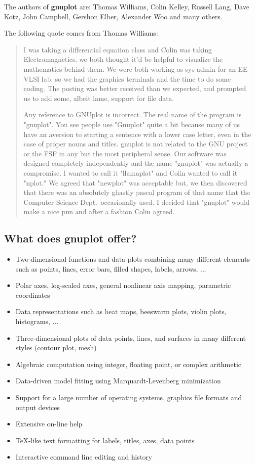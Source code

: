 \documentclass[a4paper,11pt]{article}
\newcommand{\gnuplot}{\textbf{gnuplot }}
\begin{document}
The authors of \gnuplot are:
Thomas Williams, Colin Kelley, Russell Lang, Dave Kotz, John
Campbell, Gershon Elber, Alexander Woo and many others.

The following quote comes from Thomas Williams:
\begin{quote}
     I was taking a differential equation class and Colin was taking
     Electromagnetics, we both thought it'd be helpful to visualize the
     mathematics behind them. We were both working as sys admin for an
     EE VLSI lab, so we had the graphics terminals and the time to do
     some coding. The posting was better received than we expected, and
     prompted us to add some, albeit lame, support for file data.

     Any reference to GNUplot is incorrect. The real name of the program
     is "gnuplot". You see people use "Gnuplot" quite a bit because many
     of us have an aversion to starting a sentence with a lower case
     letter, even in the case of proper nouns and titles. gnuplot is not
     related to the GNU project or the FSF in any but the most
     peripheral sense. Our software was designed completely
     independently and the name "gnuplot" was actually a compromise. I
     wanted to call it "llamaplot" and Colin wanted to call it "nplot."
     We agreed that "newplot" was acceptable but, we then discovered
     that there was an absolutely ghastly pascal program of that name
     that the Computer Science Dept.\ occasionally used. I decided that
     "gnuplot" would make a nice pun and after a fashion Colin agreed.
\end{quote}


\subsection{What does \gnuplot offer?}

\begin{itemize}
\item Two-dimensional functions and data plots combining many different
 elements such as points, lines, error bars, filled shapes, labels, arrows, ...
\item Polar axes, log-scaled axes, general nonlinear axis mapping, parametric coordinates
\item Data representations such as heat maps, beeswarm plots, violin plots, histograms, ...
\item Three-dimensional plots of data points, lines, and surfaces in
many different styles (contour plot, mesh)
\item Algebraic computation using integer, floating point, or complex arithmetic
\item Data-driven model fitting using Marquardt-Levenberg minimization
\item Support for a large number of operating systems, graphics
 file formats and output devices
\item Extensive on-line help
\item \TeX{}-like text formatting for labels, titles, axes, data points
\item Interactive command line editing and history
\end{itemize}
\end{document}
